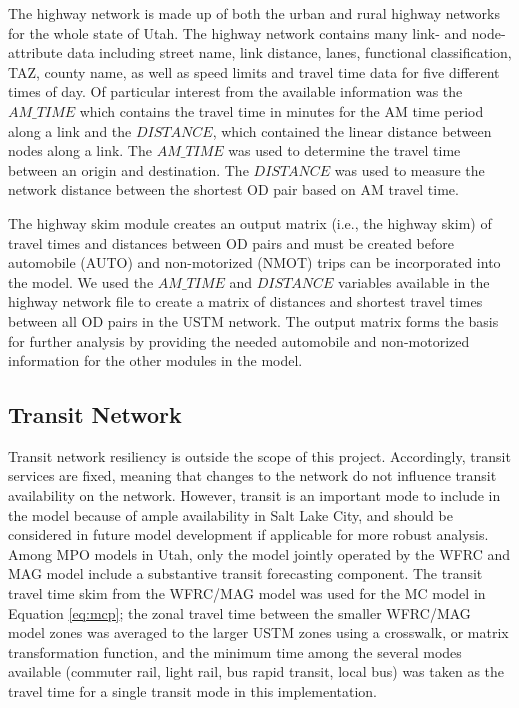 The highway network is made up of both the urban and rural highway networks
for the whole state of Utah. The highway network contains many link- and
node-attribute data including street name, link distance, lanes, functional
classification, TAZ, county name,
as well as speed limits and travel time data for five different times of day.
Of particular interest from the available information was the \(AM\_TIME\) which
contains the travel time in minutes for the AM time period along a link and
the \(DISTANCE\), which contained the linear distance between nodes along a link.
The \(AM\_TIME\) was used to determine the travel time between an origin and
destination. The \(DISTANCE\) was used to measure the network distance between
the shortest OD pair based on AM travel time.

The highway skim module creates an output matrix (i.e., the highway skim) of travel
times and distances between OD pairs and must be created
before automobile (AUTO) and non-motorized (NMOT) trips can be incorporated
into the model. We used the \(AM\_TIME\) and \(DISTANCE\) variables available in
the highway network file to create a matrix of distances and shortest travel
times between all OD pairs in the USTM network. The output matrix forms the
basis for further analysis by providing the needed automobile and non-motorized
information for the other modules in the model.

\subsection{Transit Network}

Transit network resiliency is outside the scope of this project. Accordingly, transit services are fixed, meaning that changes to the
network do not influence transit availability on the network. However, transit
is an important mode to include in the model because of ample availability in Salt Lake City, and should be
considered in future model development if applicable for more robust analysis.
Among MPO models in Utah, only the model jointly operated by the WFRC and MAG model include a
substantive transit forecasting component. The transit travel time skim from the
WFRC/MAG model was used for the MC model in Equation \ref{eq:mcp};
the zonal travel time between the smaller WFRC/MAG model zones was averaged
to the larger USTM zones using a crosswalk, or matrix transformation function, and the minimum time among the several modes available
(commuter rail, light rail, bus rapid transit, local bus) was taken as the travel
time for a single transit mode in this implementation.

